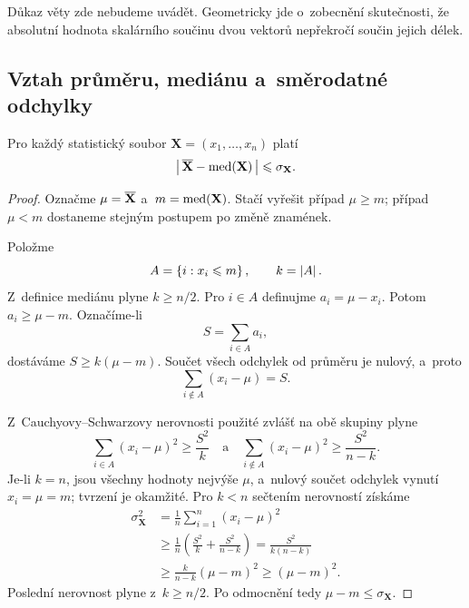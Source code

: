 Důkaz věty zde nebudeme uvádět. Geometricky jde o~zobecnění skutečnosti, že absolutní hodnota skalárního součinu dvou vektorů nepřekročí součin jejich délek.

\subsection{Vztah průměru, mediánu a~směrodatné odchylky}

\begin{proposition}\label{prop:ai-prumer-median-sigma}
    Pro každý statistický soubor
    \(\mathbf{X}=(x_1,\ldots,x_n)\) platí
    \[
        \left|\,\overline{\mathbf{X}}-\operatorname{med}(\mathbf{X})\,\right|
        \leqslant
        \sigma_{\mathbf{X}}.
    \]
\end{proposition}

\begin{proof}
    Označme \(\mu=\overline{\mathbf{X}}\) a~\(m=\operatorname{med}(\mathbf{X})\).
    Stačí vyřešit případ \(\mu\geqslant m\); případ \(\mu<m\) dostaneme stejným postupem po změně znamének.

    Položme
    \[
        A=\left\{i:x_i\leqslant m\right\},
        \qquad
        k=\left| A \right|.
    \]
    Z~definice mediánu plyne \(k\geqslant n/2\). Pro \(i\in A\) definujme
    \(a_i=\mu-x_i\). Potom \(a_i\geqslant\mu-m\). Označíme-li
    \[
        S=\sum_{i\in A}a_i,
    \]
    dostáváme \(S\geqslant k(\mu-m)\). Součet všech odchylek od průměru je nulový, a~proto
    \[
        \sum_{i\notin A}(x_i-\mu)=S.
    \]

    Z~Cauchyovy--Schwarzovy nerovnosti použité zvlášť na obě skupiny plyne
    \[
        \sum_{i\in A}(x_i-\mu)^2
        \geqslant
        \frac{S^2}{k}
        \quad\text{a}\quad
        \sum_{i\notin A}(x_i-\mu)^2
        \geqslant
        \frac{S^2}{n-k}.
    \]
    Je-li \(k=n\), jsou všechny hodnoty nejvýše \(\mu\), a~nulový součet odchylek vynutí \(x_i=\mu=m\); tvrzení je okamžité. Pro \(k<n\) sečtením nerovností získáme
    \begin{align*}
        \sigma_{\mathbf{X}}^2
        &=
        \frac1n\sum_{i=1}^{n}(x_i-\mu)^2\\
        &\geqslant
        \frac1n
        \left(
            \frac{S^2}{k}+\frac{S^2}{n-k}
        \right)
        =
        \frac{S^2}{k(n-k)}\\
        &\geqslant
        \frac{k}{n-k}(\mu-m)^2
        \geqslant
        (\mu-m)^2.
    \end{align*}
    Poslední nerovnost plyne z~\(k\geqslant n/2\). Po odmocnění tedy
    \(\mu-m\leqslant\sigma_{\mathbf{X}}\).
\end{proof}

